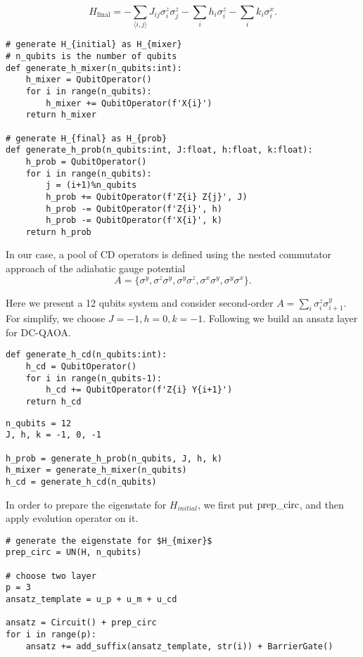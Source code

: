 \begin{equation}
    H_{\mathrm{final}} = -\sum_{\langle i,j \rangle}J_{ij}\sigma_{i}^{z}\sigma_{j}^{z} - \sum_{i}h_{i}\sigma_{i}^{z} - \sum_{i}k_{i}\sigma_{i}^{x}.
\end{equation}
\begin{lstlisting}
# generate H_{initial} as H_{mixer}
# n_qubits is the number of qubits
def generate_h_mixer(n_qubits:int):
    h_mixer = QubitOperator()
    for i in range(n_qubits):
        h_mixer += QubitOperator(f'X{i}')
    return h_mixer

# generate H_{final} as H_{prob}
def generate_h_prob(n_qubits:int, J:float, h:float, k:float):
    h_prob = QubitOperator()
    for i in range(n_qubits):
        j = (i+1)%n_qubits
        h_prob += QubitOperator(f'Z{i} Z{j}', J)
        h_prob -= QubitOperator(f'Z{i}', h)
        h_prob -= QubitOperator(f'X{i}', k)
    return h_prob
\end{lstlisting}

In our case,  a pool of CD operators is defined using the nested commutator approach of the adiabatic gauge potential \cite{PhysRevResearch.4.013141}
$$A = \{\sigma^{y},\sigma^{z}\sigma^{y}, \sigma^{y}\sigma^{z}, \sigma^{x}\sigma^{y}, \sigma^{y}\sigma^{x} \}.$$

Here we present a 12 qubits system and consider second-order $A = \sum_{i}\sigma_{i}^{z}\sigma_{i+1}^{y}$. For simplify, we choose  $J = -1, h = 0, k = -1$. Following we build an ansatz layer for DC-QAOA.
\begin{lstlisting}
def generate_h_cd(n_qubits:int):
    h_cd = QubitOperator()
    for i in range(n_qubits-1):
        h_cd += QubitOperator(f'Z{i} Y{i+1}')
    return h_cd
\end{lstlisting}

\begin{lstlisting}
n_qubits = 12
J, h, k = -1, 0, -1

h_prob = generate_h_prob(n_qubits, J, h, k)
h_mixer = generate_h_mixer(n_qubits)
h_cd = generate_h_cd(n_qubits)
\end{lstlisting}

In order to prepare the eigenstate for $H_{initial}$, we first put ${\rm prep\_circ}$, and then apply evolution operator on it.
\begin{lstlisting}
# generate the eigenstate for $H_{mixer}$
prep_circ = UN(H, n_qubits)

# choose two layer
p = 3
ansatz_template = u_p + u_m + u_cd

ansatz = Circuit() + prep_circ
for i in range(p):
    ansatz += add_suffix(ansatz_template, str(i)) + BarrierGate()
\end{lstlisting}

